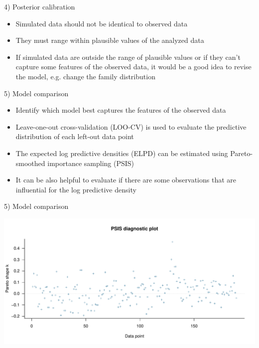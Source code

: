 \documentclass[ignorenonframetext,a4paper]{beamer}
\begin{document}
\begin{frame}{4) Posterior calibration}

\begin{itemize}
\setlength\itemsep{1em}
  \item{Simulated data should not be identical to observed data}
  \item{They must range within plausible values of the analyzed data}
  \item{If simulated data are outside the range of plausible values
        or if they can't capture some features of the observed data,
        it would be a good idea to revise the model, e.g. change the
        family distribution}
\end{itemize}

\end{frame}

\begin{frame}{5) Model comparison}

\begin{itemize}
\setlength\itemsep{1em}
  \item{Identify which model best captures the features of the 
        observed data}
  \item{Leave-one-out cross-validation (LOO-CV) is used to evaluate
        the predictive distribution of each left-out data point}
  \item{The expected log predictive densities (ELPD) can be estimated
        using Pareto-smoothed importance sampling (PSIS)}
  \item{It can be also helpful to evaluate if there are some 
        observations that are influential for the log predictive
        density}
\end{itemize}

\end{frame}

\begin{frame}{5) Model comparison}

\includegraphics{DB_presentation_slides_files/figure-beamer/unnamed-chunk-9-1.pdf}

\end{frame}
\end{document}
